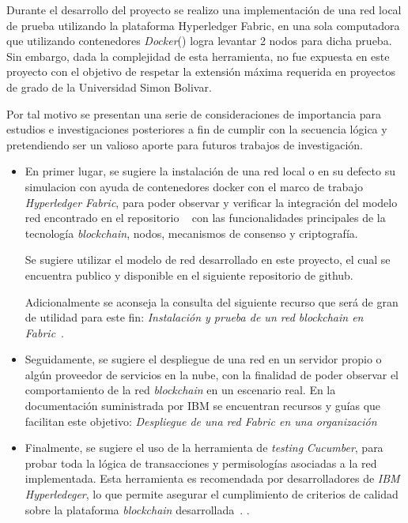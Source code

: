 Durante el desarrollo del proyecto se realizo una implementación de una red local de prueba utilizando la plataforma Hyperledger Fabric, en una sola computadora que utilizando contenedores \textit{Docker}() logra levantar 2 nodos para dicha prueba. Sin embargo, dada la complejidad  de esta herramienta, no fue expuesta  en este proyecto con el objetivo de  respetar la extensión máxima requerida en proyectos de grado de la Universidad Simon Bolivar.

Por tal motivo  se presentan una serie de consideraciones de importancia para estudios e investigaciones posteriores a fin de cumplir con la secuencia lógica y pretendiendo ser un valioso aporte para futuros trabajos de investigación.


\begin{itemize}
    \item En primer lugar, se sugiere la instalación de una red local o en su defecto su simulacion con ayuda de contenedores docker con el marco de trabajo \textit{Hyperledger Fabric}, para poder observar y verificar la integración del modelo red encontrado en el repositorio ~\cite{github:usb-library-network} con las funcionalidades principales de la tecnología \textit{blockchain}, nodos, mecanismos de consenso y criptografía.
    
    Se sugiere utilizar el modelo de red desarrollado en este proyecto, el cual se encuentra publico y disponible en el siguiente repositorio de github.
    
    Adicionalmente se aconseja la consulta del siguiente recurso que será de gran de utilidad para este fin:  \textit{Instalación y prueba de un red \textit{blockchain} en Fabric}~\cite{localFabric}.
    
    \item Seguidamente, se sugiere el despliegue de una red  en un servidor propio o algún proveedor de servicios en la nube, con la finalidad de poder observar el comportamiento de la red \textit{blockchain} en un escenario real. En la documentación suministrada por IBM se encuentran recursos y guías que facilitan este objetivo: \textit{Despliegue de una red Fabric en una organización}~\cite{organizationFabric}
    
    \item Finalmente, se sugiere el uso de la herramienta de {\it testing} \textit{Cucumber}, para probar toda la lógica de transacciones y permisologías asociadas a la red implementada. Esta herramienta es recomendada por desarrolladores de \textit{IBM Hyperledeger}, lo que permite asegurar el cumplimiento de criterios de calidad sobre la plataforma \textit{blockchain} desarrollada~\cite{testingCucumber}.
.
\end{itemize}
